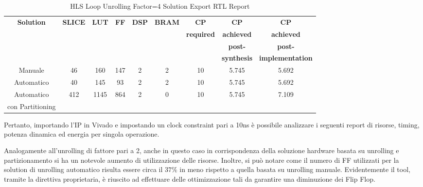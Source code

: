 \begin{table}[H]
    \centering
    \begin{tabular}{|c|c|c|c|c|c|c|c|c|}
        \hline
        \textbf{Solution} & \textbf{SLICE} & \textbf{LUT} & \textbf{FF} & \textbf{DSP} & \textbf{BRAM} & \textbf{CP} & \textbf{CP} & \textbf{CP} \\
        & & & & & & \textbf{required} & \textbf{achieved} & \textbf{achieved}\\
        & & & & & & & \textbf{post-} & \textbf{post-}\\
        & & & & & & & \textbf{synthesis} & \textbf{implementation}\\
        \hline
        Manuale & 46 & 160 & 147 & 2 & 2 & 10 & 5.745 & 5.692 \\
        \hline
        Automatico & 40 & 145 & 93 & 2 & 2 & 10 & 5.745 & 5.692 \\
        \hline
        Automatico  & 412 & 1145 & 864 & 2 & 0 & 10 & 5.745 & 7.109 \\
        con Partitioning & & & & & & & & \\
        \hline
    \end{tabular}
    \caption{HLS Loop Unrolling Factor=4 Solution Export RTL Report}
    \label{tab:vivado-loop-unrolling-factor4-solution-export-rtl-report}
\end{table}

Pertanto, importando l'IP in Vivado e impostando un clock constraint pari a 10ns è possibile analizzare i seguenti report di risorse, timing, potenza dinamica ed energia per singola operazione.


Analogamente all'unrolling di fattore pari a 2, anche in questo caso in corrispondenza della soluzione hardware basata su unrolling e partizionamento si ha un notevole aumento di utilizzazione delle risorse. Inoltre, si può notare come il numero di FF utilizzati per la solution di unrolling automatico risulta essere circa il $37\%$ in meno rispetto a quella basata su unrolling manuale. Evidentemente il tool, tramite la direttiva proprietaria, è riuscito ad effettuare delle ottimizzazione tali da garantire una diminuzione dei Flip Flop.

